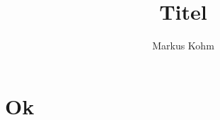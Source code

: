 \documentclass[10pt,twoside,BCOR=12mm,DIV=classic]{scrbook}
\begin{document}
\title{Titel}
\author{Markus Kohm}
\maketitle
\tableofcontents
\chapter{Ok}
\end{document}
